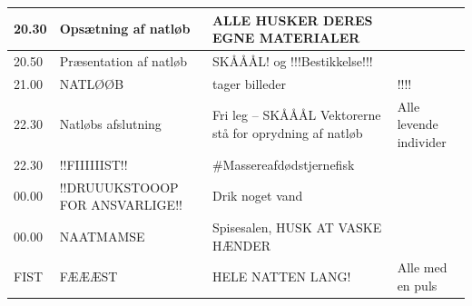 \begin{tabular}{ | p{1cm} | p{4cm} | p{5.5cm} | p{4cm} | }
\hline
	20.30 & Opsætning af natløb & ALLE HUSKER DERES EGNE MATERIALER & \Alle \Hyttebombz{} \\ \hline
	20.50 & Præsentation af natløb & SKÅÅÅL! og !!!Bestikkelse!!! & \Johnny \Ora \\ \hline
	21.00 & NATLØØB & \BIATCH \YOLO tager billeder & !!\Alle !! \\ \hline
	22.30 & Natløbs afslutning & Fri leg – SKÅÅÅL Vektorerne stå for oprydning af natløb & Alle levende individer \\ \hline
	22.30 & !!FIIIIIIST!! & \#Massereafdødstjernefisk &  \\ \hline
	00.00 & !!DRUUUKSTOOOP FOR ANSVARLIGE!! & Drik noget vand & \Lucyfar \Ora \\ \hline
	00.00 & NAATMAMSE & Spisesalen, HUSK AT VASKE HÆNDER & \Hyttebombz{} \\ \hline
	FIST & FÆÆÆST & HELE NATTEN LANG! & Alle med en puls \\ \hline
\end{tabular}

